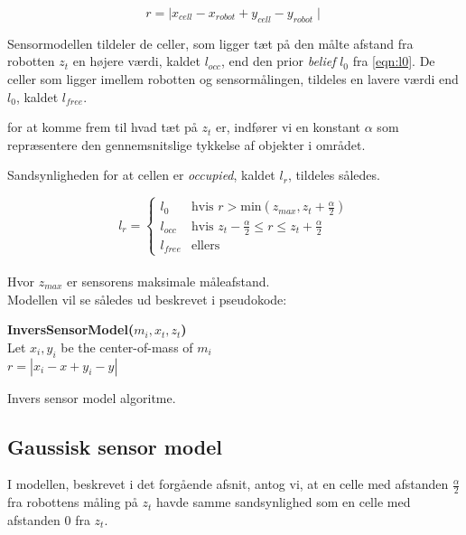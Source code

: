 \begin{equation}
r = \mid x_{cell} - x_{robot} + y_{cell} - y_{robot} \mid
\end{equation}

Sensormodellen tildeler de celler, som ligger tæt på den målte afstand fra robotten $z_t$ en højere værdi, kaldet $l_{occ}$, end den prior \textit{belief} $l_0$ fra \cref{eqn:l0}.
De celler som ligger imellem robotten og sensormålingen, tildeles en lavere værdi end $l_0$, kaldet $l_{free}$. 

for at komme frem til hvad tæt på $z_t$ er, indfører vi en konstant $\alpha$ som repræsentere den gennemsnitslige tykkelse af objekter i området.

Sandsynligheden for at cellen er \emph{occupied}, kaldet $l_r$, tildeles således.

\begin{equation}
l_{r} = \begin{cases} 
	l_0 &\text{hvis }r > \text{min}(z_{max},z_t+\frac{\alpha}{2}) \\ 
	l_{occ} &\text{hvis } z_t-\frac{\alpha}{2} \leq r \leq z_t+\frac{\alpha}{2}\\ 
	l_{free} &\text{ellers}  
\end{cases}
\end{equation} \\
Hvor $z_{max}$ er sensorens maksimale måleafstand.
\\
Modellen vil se således ud beskrevet i pseudokode:

\begin{algorithm}[H]
\textbf{InversSensorModel($m_i, x_t, z_t$)} \\
Let $x_i,y_i$ be the center-of-mass of $m_i$ \\
$r = |x_i - x + y_i - y|$ \\
\caption{Invers sensor model algoritme.}
\label{alg:inversesensormodel}
\end{algorithm}

\subsection{Gaussisk sensor model}\label{mapping:gaussisk}

I modellen, beskrevet i det forgående afsnit, antog vi, at en celle
med afstanden $\frac{\alpha}{2}$ fra robottens måling på $z_t$ havde
samme sandsynlighed som en celle med afstanden 0 fra $z_t$.

